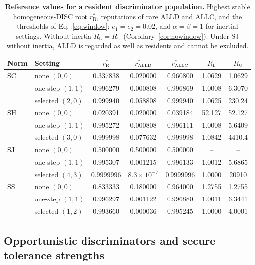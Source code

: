 \documentclass[fleqn,10pt]{wlscirep}
\newcommand{\rR}{r_{\mathrm{R}}^{*}}
\newcommand{\ALLC}{\mathrm{ALLC}}
\newcommand{\ALLD}{\mathrm{ALLD}}
\theoremstyle{plain}
\begin{document}
\begin{table}[!htbp]
\centering
\caption{\textbf{Reference values for a resident discriminator population.} Highest stable homogeneous-DISC root $\rR$, reputations of rare ALLD and ALLC, and the thresholds of Eq.~\eqref{eq:window}; $e_1=e_2=0.02$, and $\alpha=\beta=1$ for inertial settings. Without inertia $R_{\mathrm L}=R_{\mathrm U}$ (Corollary~\ref{cor:nowindow}). Under SJ without inertia, ALLD is regarded as well as residents and cannot be excluded.}
\label{tab:si-thresholds}
\small
\begin{tabular}{@{}llccccc@{}}
\toprule
Norm & Setting & $\rR$ & $r^*_{\ALLD}$ & $r^*_{\ALLC}$ & $R_{\mathrm L}$ & $R_{\mathrm U}$\\
\midrule
SC & none $(0,0)$ & 0.337838 & 0.020000 & 0.960800 & 1.0629 & 1.0629\\
 & one-step $(1,1)$ & 0.996279 & 0.000808 & 0.996869 & 1.0008 & 6.3070\\
 & selected $(2,0)$ & 0.999940 & 0.058808 & 0.999940 & 1.0625 & 230.24\\
SH & none $(0,0)$ & 0.020391 & 0.020000 & 0.039184 & 52.127 & 52.127\\
 & one-step $(1,1)$ & 0.995272 & 0.000808 & 0.996111 & 1.0008 & 5.6409\\
 & selected $(3,0)$ & 0.999998 & 0.077632 & 0.999998 & 1.0842 & 4410.4\\
SJ & none $(0,0)$ & 0.500000 & 0.500000 & 0.500000 & -- & --\\
 & one-step $(1,1)$ & 0.995307 & 0.001215 & 0.996133 & 1.0012 & 5.6865\\
 & selected $(4,3)$ & 0.9999996 & $8.3\times10^{-7}$ & 0.9999996 & 1.0000 & 20910\\
SS & none $(0,0)$ & 0.833333 & 0.180000 & 0.964000 & 1.2755 & 1.2755\\
 & one-step $(1,1)$ & 0.996297 & 0.001122 & 0.996880 & 1.0011 & 6.3441\\
 & selected $(1,2)$ & 0.993660 & 0.000036 & 0.995245 & 1.0000 & 4.0001\\
\bottomrule
\end{tabular}
\end{table}

\subsection{Opportunistic discriminators and secure tolerance strengths}
\label{si:opportunism}
\end{document}

